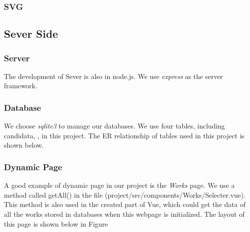 \documentclass{article}
\begin{document}
\subsubsection{SVG}

\subsection{Sever Side}
\subsubsection{Server}
The development of Sever is also in node.js. We use \textit{express} as the 
server framework.
\subsubsection{Database}
We choose \textit{sqlite3} to manage our databases. 
We use four tables, including candidata, , in this project.
The ER relationship of 
tables used in this project is shown below. 

\subsubsection{Dynamic Page}
A good example of dynamic page in our project is the \textit{Works} page.
We use a method called getAll() in the file
(project/src/components/Works/Selecter.vue). This method is also used in the 
created part of Vue, which could get the data of all the works stored in databases
when this webpage is initialized. The layout of this page is shown below in 
Figure 
    
\end{document}
